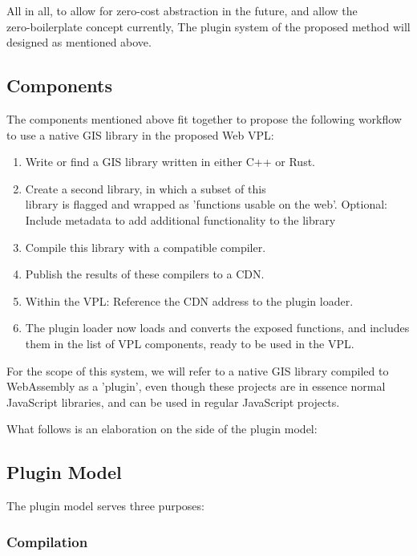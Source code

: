 All in all, to allow for zero-cost abstraction in the future, and allow the \\ zero-boilerplate
concept currently, The plugin system of the proposed method will designed as mentioned above. 

\subsection{Components}

The components mentioned above fit together to propose the following workflow to use a native GIS library in the proposed Web VPL: 
\begin{enumerate}
  \item Write or find a GIS library written in either C++ or Rust. 
  \item Create a second library, in which a subset of this \\ 
  library is flagged and wrapped as 'functions usable on the web'.
  \subitem Optional: Include metadata to add additional functionality to the library
  \item Compile this library with a compatible compiler.
  \item Publish the results of these compilers to a \ac{CDN}. 
  
  \item Within the VPL: Reference the CDN address to the plugin loader. 
  \item The plugin loader now loads and converts the exposed functions, and includes them in the list of VPL components, ready to be used in the VPL. 
\end{enumerate}

For the scope of this system, we will refer to a native GIS library compiled to \\ WebAssembly as a 'plugin', even though these projects are in essence normal JavaScript libraries, and can be used in regular JavaScript projects. 

What follows is an elaboration on the side of the plugin model:

\subsection{Plugin Model}

The plugin model serves three purposes:

\subsubsection{Compilation}

